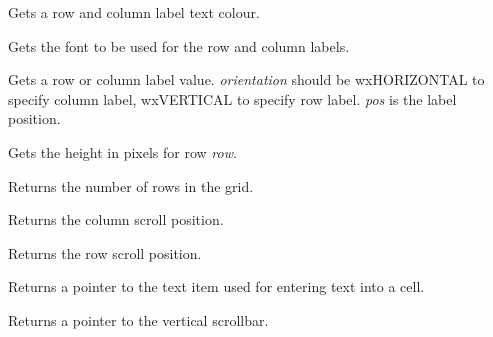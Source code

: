 \label{wxgridgetlabeltextcolour}


Gets a row and column label text colour.

\label{wxgridgetlabeltextfont}


Gets the font to be used for the row and column labels.

\label{wxgridgetlabelvalue}


Gets a row or column label value. {\it orientation} should
be wxHORIZONTAL to specify column label, wxVERTICAL to specify row label.\rtfsp
{\it pos} is the label position.

\label{wxgridgetrowheight}


Gets the height in pixels for row {\it row}.

\label{wxgridgetrows}


Returns the number of rows in the grid.

\label{wxgridgetscrollposx}


Returns the column scroll position.

\label{wxgridgetscrollposy}


Returns the row scroll position.

\label{wxgridgettextitem}


Returns a pointer to the text item used for entering text into a cell.

\label{wxgridgetvertscrollbar}


Returns a pointer to the vertical scrollbar.

